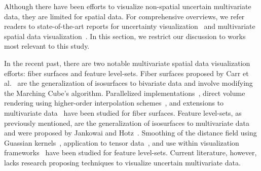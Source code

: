 Although there have been efforts to visualize non-spatial uncertain multivariate data, they are limited for spatial data.
%
For comprehensive overviews, we refer readers to state-of-the-art reports for uncertainty visualization~\cite{Bonneau2014} and multivariate spatial data visualization~\cite{he2019multivariate}.
%
In this section, we restrict our discussion to works most relevant to this study.

In the recent past, there are two notable multivariate spatial data visualization efforts: fiber surfaces and feature level-sets.
%
Fiber surfaces proposed by Carr et al.~\cite{carr2015fiber} are the generalization of isosurfaces to bivariate data and involve modifying the Marching Cube's algorithm.
%
Parallelized implementations~\cite{klacansky2016fast}, direct volume rendering using higher-order interpolation schemes~\cite{wu2016direct}, and extensions to multivariate data~\cite{blecha2020fiber} have been studied for fiber surfaces.  
%
Feature level-sets, as previously mentioned, are the generalization of isosurfaces to multivariate data and were proposed by Jankowai and Hotz~\cite{jankowai2020feature}.
%
Smoothing of the distance field using Guassian kernels~\cite{nguyen2020visualization}, application to tensor data~\cite{jankowai2020tensor}, and use within visualization frameworks~\cite{jonsson2020inviwo} have been studied for feature level-sets.
%
%
Current literature, however, lacks research proposing techniques to visualize uncertain multivariate data.
%


